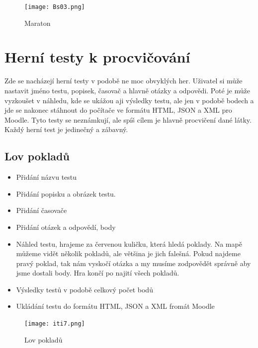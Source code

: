 \documentclass[12pt, a4paper, twoside, openright]{report}
\begin{document}
    \begin{figure}[h]
		\centering
		\texttt{[image: Bs03.png]}
		\caption{Maraton}
		\label{fig:architecture}
	\end{figure}

\chapter{Herní testy k procvičování}
 Zde se nacházejí herní testy v podobě ne moc obvyklých her. Uživatel si může nastavit jméno testu, popisek, časovač a hlavně otázky a odpovědi. Poté je může vyzkoušet v náhledu, kde se ukážou aji výsledky testu, ale jen v podobě bodech a jde se nakonec stáhnout do počítače ve formátu HTML, JSON a XML pro Moodle. Tyto testy se neznámkují, ale spíš cílem je hlavně procvičení dané látky. Každý herní test je jedinečný a zábavný.

\section{Lov pokladů}
\begin{itemize}
		\item Přidání názvu testu
		\item Přidání popisku a obrázek testu.
		\item Přidání časovače
            \item Přidání otázek a odpovědí, body
            \item Náhled testu, hrajeme za červenou kuličku, která hledá poklady. Na mapě můžeme vidět několik pokladů, ale většina je jich falešná. Pokud najdeme pravý poklad, tak nám vyskočí otázka a my musíme zodpovědět správně aby jsme dostali body. Hra končí po najití všech pokladů.
            \item Výsledky testů v podobě celkový počet bodů
            \item Ukládání testu do formátu HTML, JSON a XML fromát Moodle
	\end{itemize}

    \begin{figure}[h]
		\centering
		\texttt{[image: iti7.png]}
		\caption{Lov pokladů}
		\label{fig:architecture}
	\end{figure}
\end{document}

